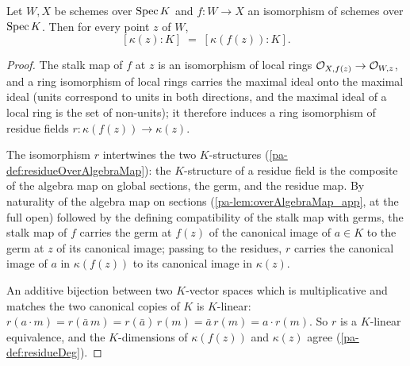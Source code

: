 \begin{lemma}
  \label{pa-lem:residueDeg_eq_of_isIso}
  \leanok

  Let \(W, X\) be schemes over \(\operatorname{Spec} K\) and \(f : W \to X\) an isomorphism of
  schemes over \(\operatorname{Spec} K\). Then for every point \(z\) of \(W\),
  \[
    [\kappa(z) : K] \;=\; [\kappa(f(z)) : K].
  \]
\end{lemma}
\begin{proof}
  \leanok
  The stalk map of \(f\) at \(z\) is an isomorphism of local rings
  \(\mathcal{O}_{X, f(z)} \to \mathcal{O}_{W, z}\), and a ring isomorphism of local rings carries
  the maximal ideal onto the maximal ideal (units correspond to units in both
  directions, and the maximal ideal of a local ring is the set of non-units); it
  therefore induces a ring isomorphism of residue fields
  \(r : \kappa(f(z)) \to \kappa(z)\).

  The isomorphism \(r\) intertwines the two \(K\)-structures
  (\ref{pa-def:residueOverAlgebraMap}): the \(K\)-structure of a residue field is the
  composite of the algebra map on global sections, the germ, and the residue map. By
  naturality of the algebra map on sections (\ref{pa-lem:overAlgebraMap_app}, at the full
  open) followed by the defining compatibility of the stalk map with germs, the stalk
  map of \(f\) carries the germ at \(f(z)\) of the canonical image of \(a \in K\) to
  the germ at \(z\) of its canonical image; passing to the residues, \(r\) carries the
  canonical image of \(a\) in \(\kappa(f(z))\) to its canonical image in
  \(\kappa(z)\).

  An additive bijection between two \(K\)-vector spaces which is multiplicative and
  matches the two canonical copies of \(K\) is \(K\)-linear: \(r(a \cdot m) =
  r(\bar a\, m) = r(\bar a)\, r(m) = \bar a\, r(m) = a \cdot r(m)\). So \(r\) is a
  \(K\)-linear equivalence, and the \(K\)-dimensions of \(\kappa(f(z))\) and
  \(\kappa(z)\) agree (\ref{pa-def:residueDeg}).
\end{proof}

